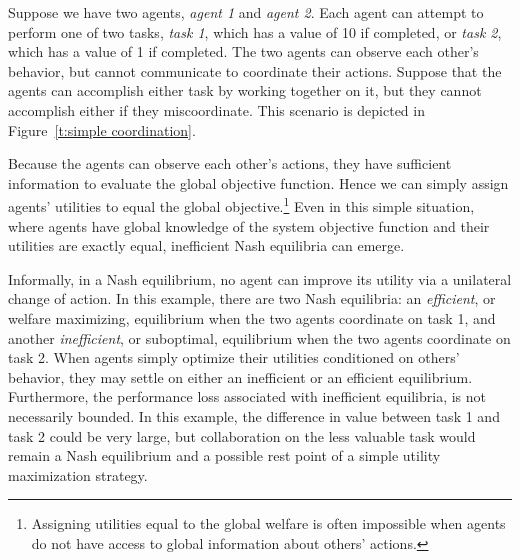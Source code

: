 \begin{example}\label{e:interdependent utilities}
Suppose we have two agents, {\it agent 1} and {\it agent 2}. Each agent can attempt to perform one of two tasks, {\it task 1}, which has a value of 10 if completed, or {\it task 2}, which has a value of 1 if completed.  The two agents can observe each other's behavior, but cannot communicate to coordinate their actions. Suppose that the agents can accomplish either task by working together on it, but they cannot accomplish either if they miscoordinate. This scenario is depicted in Figure~\ref{t:simple coordination}.

Because the agents can observe each other's actions, they have sufficient information to evaluate the global objective function. Hence we can simply assign agents' utilities to equal the global objective.\footnote{Assigning utilities equal to the global welfare is often impossible when agents do not have access to global information about others' actions.} Even in this simple situation, where agents have global knowledge of the system objective function and their utilities are exactly equal, inefficient Nash equilibria can emerge.

Informally, in a Nash equilibrium, no agent can improve its utility via a unilateral change of action. In this example, there are two Nash equilibria: an {\it efficient}, or welfare maximizing, equilibrium when the two agents coordinate on task 1, and another {\it inefficient}, or suboptimal, equilibrium when the two agents coordinate on task 2. When agents simply optimize their utilities conditioned on others' behavior, they may settle on either an inefficient or an efficient equilibrium. Furthermore, the performance loss associated with inefficient equilibria, is not necessarily bounded. In this example, the difference in value between task 1 and task 2 could be very large, but collaboration on the less valuable task would remain a Nash equilibrium and a possible rest point of a simple utility maximization strategy.




\end{example}
